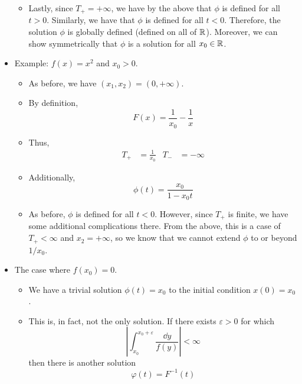 \documentclass[../notes.tex]{subfiles}
\begin{document}
\begin{itemize}
\begin{itemize}
\begin{equation*}
        \end{equation*}
        \item Lastly, since $T_+=+\infty$, we have by the above that $\phi$ is defined for all $t>0$. Similarly, we have that $\phi$ is defined for all $t<0$. Therefore, the solution $\phi$ is globally defined (defined on all of $\mathbb{R}$). Moreover, we can show symmetrically that $\phi$ is a solution for all $x_0\in\mathbb{R}$.
    \end{itemize}
    \item Example: $f(x)=x^2$ and $x_0>0$.
    \begin{itemize}
        \item As before, we have $(x_1,x_2)=(0,+\infty)$.
        \item By definition,
        \begin{equation*}
            F(x) = \frac{1}{x_0}-\frac{1}{x}
        \end{equation*}
        \item Thus,
        \begin{align*}
            T_+ &= \frac{1}{x_0}&
            T_- &= -\infty
        \end{align*}
        \item Additionally,
        \begin{equation*}
            \phi(t) = \frac{x_0}{1-x_0t}
        \end{equation*}
        \item As before, $\phi$ is defined for all $t<0$. However, since $T_+$ is finite, we have some additional complications there. From the above, this is a case of $T_+<\infty$ and $x_2=+\infty$, so we know that we cannot extend $\phi$ to or beyond $1/x_0$.
    \end{itemize}
    \item The case where $f(x_0)=0$.
    \begin{itemize}
        \item We have a trivial solution $\phi(t)=x_0$ to the initial condition $x(0)=x_0$.
        \item This is, in fact, not the only solution. If there exists $\varepsilon>0$ for which
        \begin{equation*}
            \left| \int_{x_0}^{x_0+\varepsilon}\frac{\dd{y}}{f(y)} \right| < \infty
        \end{equation*}
        then there is another solution
        \begin{equation*}
            \varphi(t) = F^{-1}(t)
        \end{equation*}

\end{itemize}
\end{itemize}
\end{document}
